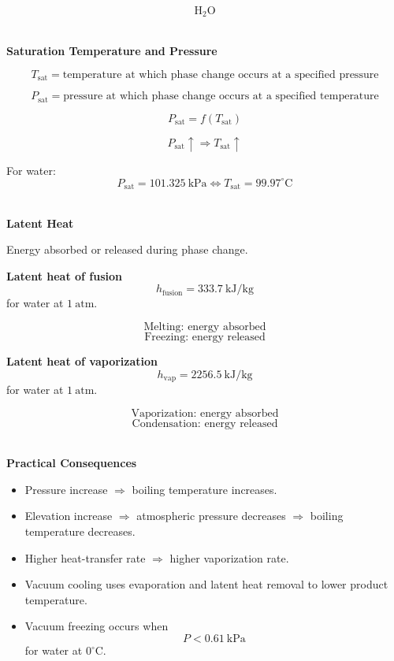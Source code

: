 \documentclass[12pt]{article}
\begin{document}
\[
\boxed{\mathrm{H_2O}}
\]

\textbf{\\ Saturation Temperature and Pressure}

\begin{equation*}
\boxed{
T_{\mathrm{sat}}
=
\text{temperature at which phase change occurs at a specified pressure}
}
\end{equation*}

\begin{equation*}
\boxed{
P_{\mathrm{sat}}
=
\text{pressure at which phase change occurs at a specified temperature}
}
\end{equation*}

\[
\boxed{P_{\mathrm{sat}}=f(T_{\mathrm{sat}})}
\]

\[
\boxed{
P_{\mathrm{sat}}\uparrow
\Rightarrow
T_{\mathrm{sat}}\uparrow
}
\]

For water:
\[
P_{\mathrm{sat}}=101.325~\mathrm{kPa}
\Longleftrightarrow
T_{\mathrm{sat}}=99.97^\circ\mathrm{C}
\]

\textbf{\\ Latent Heat}

Energy absorbed or released during phase change.

\textbf{Latent heat of fusion}
\[
\boxed{h_{\mathrm{fusion}}=333.7~\mathrm{kJ/kg}}
\]
for water at $1~\mathrm{atm}$.

\[
\boxed{\text{Melting: energy absorbed}}
\]
\[
\boxed{\text{Freezing: energy released}}
\]

\textbf{Latent heat of vaporization}
\[
\boxed{h_{\mathrm{vap}}=2256.5~\mathrm{kJ/kg}}
\]
for water at $1~\mathrm{atm}$.

\[
\boxed{\text{Vaporization: energy absorbed}}
\]
\[
\boxed{\text{Condensation: energy released}}
\]

\textbf{\\ Practical Consequences}

\begin{itemize}[leftmargin=*]
    \item Pressure increase $\Rightarrow$ boiling temperature increases.
    \item Elevation increase $\Rightarrow$ atmospheric pressure decreases $\Rightarrow$ boiling temperature decreases.
    \item Higher heat-transfer rate $\Rightarrow$ higher vaporization rate.
    \item Vacuum cooling uses evaporation and latent heat removal to lower product temperature.
    \item Vacuum freezing occurs when
    \[
    P<0.61~\mathrm{kPa}
    \]
    for water at $0^\circ\mathrm{C}$.
\end{itemize}
\end{document}
